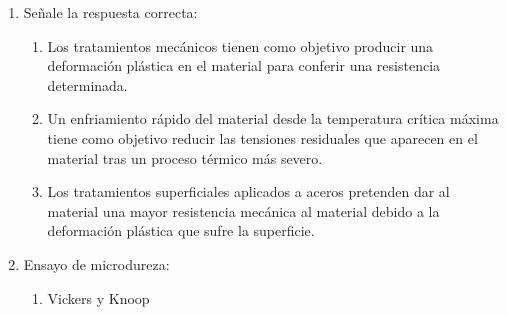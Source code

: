 \begin{enumerate}[label=\textbf{\arabic*.}]
    \item Señale la respuesta correcta:
          \begin{enumerate}[label=\alph*.]
              \item \textcolor{red!85!black}{Los tratamientos mecánicos tienen como objetivo producir una deformación plástica en el material para conferir una resistencia determinada.}
              \item Un enfriamiento rápido del material desde la temperatura crítica máxima tiene como objetivo reducir las tensiones residuales que aparecen en el material tras un proceso térmico más severo.
              \item Los tratamientos superficiales aplicados a aceros pretenden dar al material una mayor resistencia mecánica al material debido a la deformación plástica que sufre la superficie.
          \end{enumerate}

    \item Ensayo de microdureza:
          \begin{enumerate}[label=\alph*.]
              \item \textcolor{red!85!black}{Vickers y Knoop}
          \end{enumerate}
\end{enumerate}

